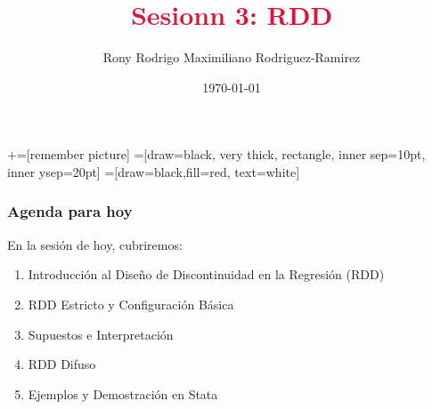 \documentclass[notes,10pt,aspectratio=169]{beamer}
\title[]{\textcolor{crimson}{Sesionn 3: RDD}}
\author[RRMRR]{Rony Rodrigo Maximiliano Rodriguez-Ramirez}
\institute[Harvard]{\small{Econ Thaki \\ Harvard University}}
\date{\today}
\begin{document}
\newcommand\marktopleft[1]{%
    \tikz[overlay,remember picture] 
        \node (marker-#1-a) at (-.3em,.3em) {};%
}
\newcommand\markbottomright[2]{%
    \tikz[overlay,remember picture] 
        \node (marker-#1-b) at (0em,0em) {};%
}
+=[remember picture] 
 =[draw=black, very thick, rectangle, inner sep=10pt, inner ysep=20pt]
 =[draw=black,fill=red, text=white]



\begin{frame}
  \maketitle
\end{frame}

\begin{frame}
  \frametitle{Agenda para hoy}

  En la sesión de hoy, cubriremos:
  \begin{enumerate}
    \item Introducción al Diseño de Discontinuidad en la Regresión (RDD)
    \item RDD Estricto y Configuración Básica
    \item Supuestos e Interpretación
    \item RDD Difuso
    \item Ejemplos y Demostración en Stata
  \end{enumerate}
\end{frame}
\end{document}
